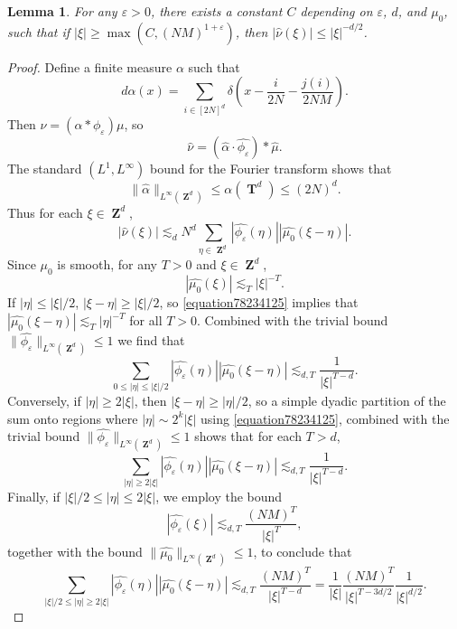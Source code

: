 \documentclass[12pt,reqno]{article}
\DeclareMathOperator{\ZZ}{\mathbf{Z}}
\DeclareMathOperator{\TT}{\mathbf{T}}
\newtheorem{lemma}[theorem]{Lemma}
\begin{document}
\begin{lemma} \label{lemma6213}
    For any $\varepsilon > 0$, there exists a constant $C$ depending on $\varepsilon$, $d$, and $\mu_0$, such that if $|\xi| \geq \max( C, (NM)^{1 + \varepsilon})$, then $|\widehat{\nu}(\xi)| \leq |\xi|^{-d/2}$.
\end{lemma}
\begin{proof}
    Define a finite measure $\alpha$ such that
    \[ d\alpha(x) = \sum_{i \in [2N]^d} \delta \left( x - \frac{i}{2N} - \frac{j(i)}{2NM} \right). \]
    Then $\nu = (\alpha * \phi_\varepsilon) \mu$, so
    \[ \widehat{\nu} = \left(\widehat{\alpha} \cdot \widehat{\phi_\varepsilon} \right) * \widehat{\mu}. \]
    The standard $(L^1,L^\infty)$ bound for the Fourier transform shows that
    \[ \| \widehat{\alpha} \|_{L^\infty(\ZZ^d)} \leq \alpha(\TT^d) \leq (2N)^d. \]
    Thus for each $\xi \in \ZZ^d$,
    \[ |\widehat{\nu}(\xi)| \lesssim_d N^d \sum_{\eta \in \ZZ^d} |\widehat{\phi_\varepsilon}(\eta)| |\widehat{\mu_0}(\xi-\eta)|. \]
    Since $\mu_0$ is smooth, for any $T > 0$ and $\xi \in \ZZ^d$,
    \begin{equation} \label{equation78234125}
        |\widehat{\mu_0}(\xi)| \lesssim_T |\xi|^{-T}.
    \end{equation}
    If $|\eta| \leq |\xi|/2$, $|\xi - \eta| \geq |\xi|/2$, so \eqref{equation78234125} implies that $|\widehat{\mu_0}(\xi - \eta)| \lesssim_T |\eta|^{-T}$ for all $T > 0$. Combined with the trivial bound $\| \widehat{\phi_\varepsilon} \|_{L^\infty(\ZZ^d)} \leq 1$ we find that
    \[ \sum_{0 \leq |\eta| \leq |\xi|/2} |\widehat{\phi_\varepsilon}(\eta)| |\widehat{\mu_0}(\xi-\eta)| \lesssim_{d,T} \frac{1}{|\xi|^{T-d}}. \]
    Conversely, if $|\eta| \geq 2 |\xi|$, then $|\xi - \eta| \geq |\eta|/2$, so a simple dyadic partition of the sum onto regions where $|\eta| \sim 2^k |\xi|$ using \eqref{equation78234125}, combined with the trivial bound $\| \widehat{\phi_\varepsilon} \|_{L^\infty(\ZZ^d)} \leq 1$ shows that for each $T > d$,
    \[ \sum_{|\eta| \geq 2 |\xi|} |\widehat{\phi_\varepsilon}(\eta)| |\widehat{\mu_0}(\xi-\eta)| \lesssim_{d,T} \frac{1}{|\xi|^{T-d}}. \]
    Finally, if $|\xi|/2 \leq |\eta| \leq 2|\xi|$, we employ the bound
    \[ |\widehat{\phi_\varepsilon}(\xi)| \lesssim_{d,T} \frac{(NM)^T}{|\xi|^T}, \]
    together with the bound $\| \widehat{\mu_0} \|_{L^\infty(\ZZ^d)} \leq 1$, to conclude that
    \[ \sum_{|\xi|/2 \leq |\eta| \geq 2 |\xi|} |\widehat{\phi_\varepsilon}(\eta)| |\widehat{\mu_0}(\xi-\eta)| \lesssim_{d,T} \frac{(NM)^T}{|\xi|^{T-d}} = \frac{1}{|\xi|} \frac{(NM)^T}{|\xi|^{T-3d/2}} \frac{1}{|\xi|^{d/2}}. \]

\end{proof}
\end{document}
